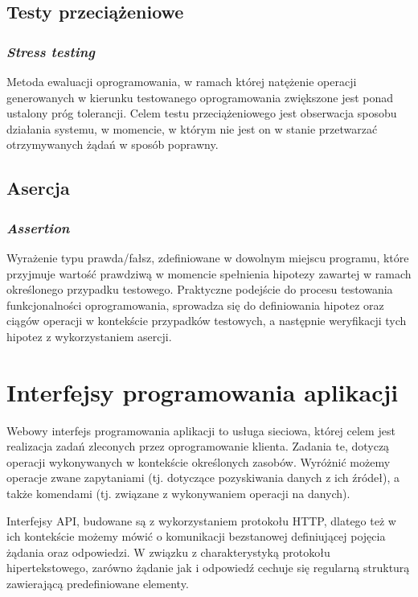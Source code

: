 \subsection*{Testy przeciążeniowe}
\subsubsection{\textit{Stress testing}}
Metoda ewaluacji oprogramowania, w ramach której natężenie operacji generowanych w kierunku testowanego oprogramowania zwiększone jest ponad ustalony próg tolerancji. Celem testu przeciążeniowego jest obserwacja sposobu działania systemu, w momencie, w którym nie jest on w stanie przetwarzać otrzymywanych żądań w sposób poprawny.

\subsection*{Asercja}
\subsubsection{\textit{Assertion}}
Wyrażenie typu prawda/fałsz, zdefiniowane w dowolnym miejscu programu, które przyjmuje wartość prawdziwą w momencie spełnienia hipotezy zawartej w ramach określonego przypadku testowego. Praktyczne podejście do procesu testowania funkcjonalności oprogramowania, sprowadza się do definiowania hipotez oraz ciągów operacji w kontekście przypadków testowych, a następnie weryfikacji tych hipotez z wykorzystaniem asercji.

\section{Interfejsy programowania aplikacji}
\label{sec:api-teoria}
Webowy interfejs programowania aplikacji to usługa sieciowa, której celem jest realizacja zadań zleconych przez oprogramowanie klienta. Zadania te, dotyczą operacji wykonywanych w kontekście określonych zasobów. Wyróżnić możemy operacje zwane zapytaniami (tj. dotyczące pozyskiwania danych z ich źródeł), a także komendami (tj. związane z wykonywaniem operacji na danych).

Interfejsy API, budowane są z wykorzystaniem protokołu HTTP, dlatego też w ich kontekście możemy mówić o komunikacji bezstanowej definiującej pojęcia żądania oraz odpowiedzi. W związku z charakterystyką protokołu hipertekstowego, zarówno żądanie jak i odpowiedź cechuje się regularną strukturą zawierającą predefiniowane elementy.

